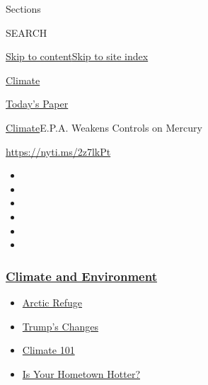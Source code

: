 Sections

SEARCH

\protect\hyperlink{site-content}{Skip to
content}\protect\hyperlink{site-index}{Skip to site index}

\href{https://www.nytimes3xbfgragh.onion/section/climate}{Climate}

\href{https://myaccount.nytimes3xbfgragh.onion/auth/login?response_type=cookie\&client_id=vi}{}

\href{https://www.nytimes3xbfgragh.onion/section/todayspaper}{Today's
Paper}

\href{/section/climate}{Climate}\textbar{}E.P.A. Weakens Controls on
Mercury

\url{https://nyti.ms/2z7lkPt}

\begin{itemize}
\item
\item
\item
\item
\item
\item
\end{itemize}

\hypertarget{climate-and-environment}{%
\subsubsection{\texorpdfstring{\href{https://www.nytimes3xbfgragh.onion/section/climate?name=styln-climate\&region=TOP_BANNER\&variant=undefined\&block=storyline_menu_recirc\&action=click\&pgtype=Article\&impression_id=f7149e50-e394-11ea-af8a-cf9df229f915}{Climate
and
Environment}}{Climate and Environment}}\label{climate-and-environment}}

\begin{itemize}
\tightlist
\item
  \href{https://www.nytimes3xbfgragh.onion/2020/08/17/climate/alaska-oil-drilling-anwr.html?name=styln-climate\&region=TOP_BANNER\&variant=undefined\&block=storyline_menu_recirc\&action=click\&pgtype=Article\&impression_id=f7149e51-e394-11ea-af8a-cf9df229f915}{Arctic
  Refuge}
\item
  \href{https://www.nytimes3xbfgragh.onion/interactive/2020/climate/trump-environment-rollbacks.html?name=styln-climate\&region=TOP_BANNER\&variant=undefined\&block=storyline_menu_recirc\&action=click\&pgtype=Article\&impression_id=f7149e52-e394-11ea-af8a-cf9df229f915}{Trump's
  Changes}
\item
  \href{https://www.nytimes3xbfgragh.onion/interactive/2020/04/19/climate/climate-crash-course-1.html?name=styln-climate\&region=TOP_BANNER\&variant=undefined\&block=storyline_menu_recirc\&action=click\&pgtype=Article\&impression_id=f7149e53-e394-11ea-af8a-cf9df229f915}{Climate
  101}
\item
  \href{https://www.nytimes3xbfgragh.onion/interactive/2018/08/30/climate/how-much-hotter-is-your-hometown.html?name=styln-climate\&region=TOP_BANNER\&variant=undefined\&block=storyline_menu_recirc\&action=click\&pgtype=Article\&impression_id=f7149e54-e394-11ea-af8a-cf9df229f915}{Is
  Your Hometown Hotter?}
\end{itemize}


